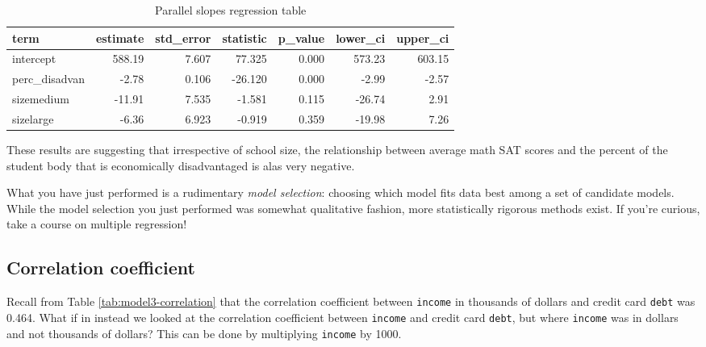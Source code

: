 \documentclass[12pt, krantz2,]{krantz}
\makeatletter
\newenvironment{Shaded}{\begin{snugshade}}{\end{snugshade}}
\newcommand{\DataTypeTok}[1]{\textcolor[rgb]{0.27,0.27,0.27}{#1}}
\newcommand{\DecValTok}[1]{\textcolor[rgb]{0.06,0.06,0.06}{#1}}
\newcommand{\KeywordTok}[1]{\textcolor[rgb]{0.27,0.27,0.27}{\textbf{#1}}}
\newcommand{\NormalTok}[1]{#1}
\newcommand{\OperatorTok}[1]{\textcolor[rgb]{0.43,0.43,0.43}{\textbf{#1}}}
\newcommand{\StringTok}[1]{\textcolor[rgb]{0.5,0.5,0.5}{#1}}
\newenvironment{kframe}{%
\medskip{}
\setlength{\fboxsep}{.8em}
 \def\at@end@of@kframe{}%
 \ifinner\ifhmode%
  \def\at@end@of@kframe{\end{minipage}}%
  \begin{minipage}{\columnwidth}%
 \fi\fi%
 \def\FrameCommand##1{\hskip\@totalleftmargin \hskip-\fboxsep
 \colorbox{shadecolor}{##1}\hskip-\fboxsep
     \hskip-\linewidth \hskip-\@totalleftmargin \hskip\columnwidth}%
 \MakeFramed {\advance\hsize-\width
   \@totalleftmargin\z@ \linewidth\hsize
   \@setminipage}}%
 {\par\unskip\endMakeFramed%
 \at@end@of@kframe}
\renewenvironment{Shaded}{\begin{kframe}}{\end{kframe}}
\makeatother
\begin{document}
\begin{table}[H]

\caption{\label{tab:model2-parallel-slopes}Parallel slopes regression table}
\centering
\fontsize{10}{12}\selectfont
\begin{tabular}{lrrrrrr}
\toprule
term & estimate & std\_error & statistic & p\_value & lower\_ci & upper\_ci\\
\midrule
intercept & 588.19 & 7.607 & 77.325 & 0.000 & 573.23 & 603.15\\
perc\_disadvan & -2.78 & 0.106 & -26.120 & 0.000 & -2.99 & -2.57\\
sizemedium & -11.91 & 7.535 & -1.581 & 0.115 & -26.74 & 2.91\\
sizelarge & -6.36 & 6.923 & -0.919 & 0.359 & -19.98 & 7.26\\
\bottomrule
\end{tabular}
\end{table}

These results are suggesting that irrespective of school size, the relationship between average math SAT scores and the percent of the student body that is economically disadvantaged is alas very negative.

What you have just performed is a rudimentary \emph{model selection}: choosing which model fits data best among a set of candidate models. While the model selection you just performed was somewhat qualitative fashion, more statistically rigorous methods exist. If you're curious, take a course on multiple regression!

\hypertarget{correlationcoefficient2}{%
\subsection{Correlation coefficient}\label{correlationcoefficient2}}

Recall from Table \ref{tab:model3-correlation} that the correlation coefficient between \texttt{income} in thousands of dollars and credit card \texttt{debt} was 0.464. What if in instead we looked at the correlation coefficient between \texttt{income} and credit card \texttt{debt}, but where \texttt{income} was in dollars and not thousands of dollars? This can be done by multiplying \texttt{income} by 1000.

\begin{Shaded}
\end{Shaded}
\end{document}
